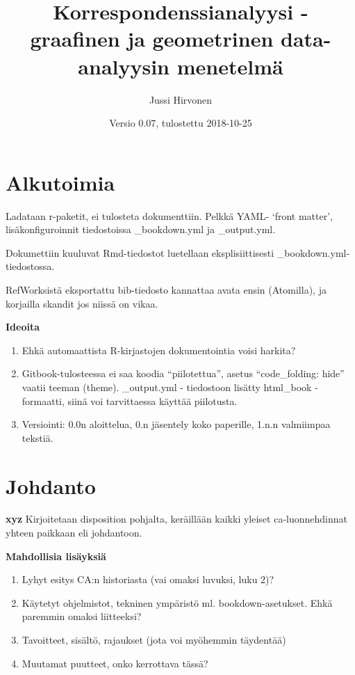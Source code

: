 \documentclass[finnish,]{book}
\title{Korrespondenssianalyysi - graafinen ja geometrinen data-analyysin
menetelmä}
\author{Jussi Hirvonen}
\date{Versio 0.07, tulostettu 2018-10-25}
\theoremstyle{definition}
\theoremstyle{definition}
\theoremstyle{definition}
\theoremstyle{remark}
\begin{document}
\maketitle

{
\setcounter{tocdepth}{2}
\tableofcontents
}
\hypertarget{alkutoimia}{%
\chapter*{Alkutoimia}\label{alkutoimia}}

Ladataan r-paketit, ei tulosteta dokumenttiin. Pelkkä YAML- `front
matter', lisäkonfiguroinnit tiedostoissa \_bookdown.yml ja \_output.yml.

Dokumettiin kuuluvat Rmd-tiedostot luetellaan eksplisiittisesti
\_bookdown.yml-tiedostossa.

RefWorksistä eksportattu bib-tiedosto kannattaa avata ensin (Atomilla),
ja korjailla skandit jos niissä on vikaa.

\textbf{Ideoita}

\begin{enumerate}
\def\labelenumi{\arabic{enumi}.}
\item
  Ehkä automaattista R-kirjastojen dokumentointia voisi harkita?
\item
  Gitbook-tulosteessa ei saa koodia ``piilotettua'', asetus
  ``code\_folding: hide'' vaatii teeman (theme). \_output.yml -
  tiedostoon lisätty html\_book - formaatti, siinä voi tarvittaessa
  käyttää piilotusta.
\item
  Versiointi: 0.0n aloittelua, 0.n jäsentely koko paperille, 1.n.n
  valmiimpaa tekstiä.
\end{enumerate}

\hypertarget{johdanto}{%
\chapter{Johdanto}\label{johdanto}}

\textbf{xyz} Kirjoitetaan disposition pohjalta, keräillään kaikki
yleiset ca-luonnehdinnat yhteen paikkaan eli johdantoon.

\textbf{Mahdollisia lisäyksiä}

\begin{enumerate}
\def\labelenumi{\arabic{enumi}.}
\item
  Lyhyt esitys CA:n historiasta (vai omaksi luvuksi, luku 2)?
\item
  Käytetyt ohjelmistot, tekninen ympäristö ml. bookdown-asetukset. Ehkä
  paremmin omaksi liitteeksi?
\item
  Tavoitteet, sisältö, rajaukset (jota voi myöhemmin täydentää)
\item
  Muutamat puutteet, onko kerrottava tässä?
\end{enumerate}
\end{document}
